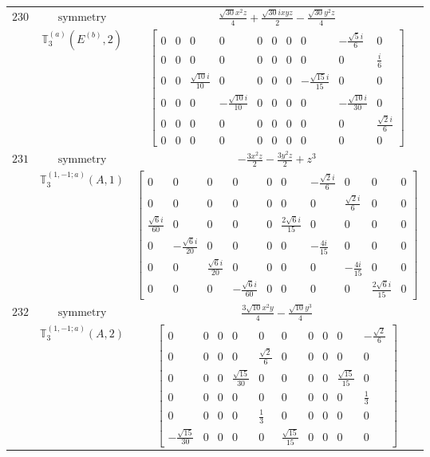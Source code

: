 \documentclass[fleqn,8pt,landscape]{jsarticle}
\begin{document}
\begin{longtable}{ccc}
$ 230 $ & $ \text{symmetry} $ & $ \frac{\sqrt{30} x^{2} z}{4} + \frac{\sqrt{30} i x y z}{2} - \frac{\sqrt{30} y^{2} z}{4} $ \\
$  $ & $ \mathbb{T}_{3}^{(a)}(E^{(b)},2) $ & $ \begin{bmatrix} 0 & 0 & 0 & 0 & 0 & 0 & 0 & 0 & - \frac{\sqrt{5} i}{6} & 0 \\ 0 & 0 & 0 & 0 & 0 & 0 & 0 & 0 & 0 & \frac{i}{6} \\ 0 & 0 & \frac{\sqrt{10} i}{10} & 0 & 0 & 0 & 0 & - \frac{\sqrt{15} i}{15} & 0 & 0 \\ 0 & 0 & 0 & - \frac{\sqrt{10} i}{10} & 0 & 0 & 0 & 0 & - \frac{\sqrt{10} i}{30} & 0 \\ 0 & 0 & 0 & 0 & 0 & 0 & 0 & 0 & 0 & \frac{\sqrt{2} i}{6} \\ 0 & 0 & 0 & 0 & 0 & 0 & 0 & 0 & 0 & 0 \end{bmatrix} $ \\ \hline
$ 231 $ & $ \text{symmetry} $ & $ - \frac{3 x^{2} z}{2} - \frac{3 y^{2} z}{2} + z^{3} $ \\
$  $ & $ \mathbb{T}_{3}^{(1,-1;a)}(A,1) $ & $ \begin{bmatrix} 0 & 0 & 0 & 0 & 0 & 0 & - \frac{\sqrt{2} i}{6} & 0 & 0 & 0 \\ 0 & 0 & 0 & 0 & 0 & 0 & 0 & \frac{\sqrt{2} i}{6} & 0 & 0 \\ \frac{\sqrt{6} i}{60} & 0 & 0 & 0 & 0 & \frac{2 \sqrt{6} i}{15} & 0 & 0 & 0 & 0 \\ 0 & - \frac{\sqrt{6} i}{20} & 0 & 0 & 0 & 0 & - \frac{4 i}{15} & 0 & 0 & 0 \\ 0 & 0 & \frac{\sqrt{6} i}{20} & 0 & 0 & 0 & 0 & - \frac{4 i}{15} & 0 & 0 \\ 0 & 0 & 0 & - \frac{\sqrt{6} i}{60} & 0 & 0 & 0 & 0 & \frac{2 \sqrt{6} i}{15} & 0 \end{bmatrix} $ \\ \hline
$ 232 $ & $ \text{symmetry} $ & $ \frac{3 \sqrt{10} x^{2} y}{4} - \frac{\sqrt{10} y^{3}}{4} $ \\
$  $ & $ \mathbb{T}_{3}^{(1,-1;a)}(A,2) $ & $ \begin{bmatrix} 0 & 0 & 0 & 0 & 0 & 0 & 0 & 0 & 0 & - \frac{\sqrt{2}}{6} \\ 0 & 0 & 0 & 0 & \frac{\sqrt{2}}{6} & 0 & 0 & 0 & 0 & 0 \\ 0 & 0 & 0 & \frac{\sqrt{15}}{30} & 0 & 0 & 0 & 0 & \frac{\sqrt{15}}{15} & 0 \\ 0 & 0 & 0 & 0 & 0 & 0 & 0 & 0 & 0 & \frac{1}{3} \\ 0 & 0 & 0 & 0 & \frac{1}{3} & 0 & 0 & 0 & 0 & 0 \\ - \frac{\sqrt{15}}{30} & 0 & 0 & 0 & 0 & \frac{\sqrt{15}}{15} & 0 & 0 & 0 & 0 \end{bmatrix} $ \\ \hline

\end{longtable}
\end{document}
